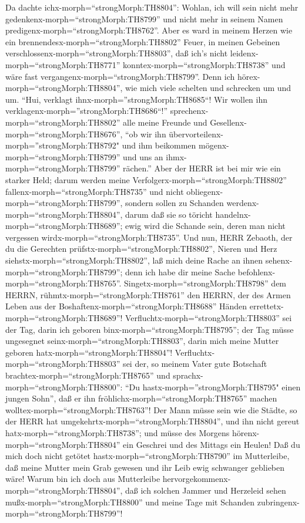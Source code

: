  Da dachte ichx-morph=``strongMorph:TH8804'': Wohlan, ich
will sein nicht mehr gedenkenx-morph=``strongMorph:TH8799'' und nicht
mehr in seinem Namen predigenx-morph=``strongMorph:TH8762''. Aber es
ward in meinem Herzen wie ein brennendesx-morph=``strongMorph:TH8802''
Feuer, in meinen Gebeinen verschlossenx-morph=``strongMorph:TH8803'',
daß ich's nicht leidenx-morph=``strongMorph:TH8771''
konntex-morph=``strongMorph:TH8738'' und wäre fast
vergangenx-morph=``strongMorph:TH8799''.  Denn ich
hörex-morph=``strongMorph:TH8804'', wie mich viele schelten und
schrecken um und um. ``Hui, verklagt ihnx-morph=''strongMorph:TH8685``!
Wir wollen ihn verklagenx-morph=''strongMorph:TH8686``!''
sprechenx-morph=``strongMorph:TH8802'' alle meine Freunde und
Gesellenx-morph=``strongMorph:TH8676'', ``ob wir ihn
übervorteilenx-morph=''strongMorph:TH8792" und ihm beikommen
mögenx-morph=``strongMorph:TH8799'' und uns an
ihmx-morph=``strongMorph:TH8799'' rächen.''  Aber der HERR
ist bei mir wie ein starker Held; darum werden meine
Verfolgerx-morph=``strongMorph:TH8802''
fallenx-morph=``strongMorph:TH8735'' und nicht
obliegenx-morph=``strongMorph:TH8799'', sondern sollen zu Schanden
werdenx-morph=``strongMorph:TH8804'', darum daß sie so töricht
handelnx-morph=``strongMorph:TH8689''; ewig wird die Schande sein, deren
man nicht vergessen wirdx-morph=``strongMorph:TH8735''. 
Und nun, HERR Zebaoth, der du die Gerechten
prüfstx-morph=``strongMorph:TH8802'', Nieren und Herz
siehstx-morph=``strongMorph:TH8802'', laß mich deine Rache an ihnen
sehenx-morph=``strongMorph:TH8799''; denn ich habe dir meine Sache
befohlenx-morph=``strongMorph:TH8765''. 
Singetx-morph=``strongMorph:TH8798'' dem HERRN,
rühmtx-morph=``strongMorph:TH8761'' den HERRN, der des Armen Leben aus
der Boshaftenx-morph=``strongMorph:TH8688'' Händen
errettetx-morph=``strongMorph:TH8689''! 
Verfluchtx-morph=``strongMorph:TH8803'' sei der Tag, darin ich geboren
binx-morph=``strongMorph:TH8795''; der Tag müsse ungesegnet
seinx-morph=``strongMorph:TH8803'', darin mich meine Mutter geboren
hatx-morph=``strongMorph:TH8804''! 
Verfluchtx-morph=``strongMorph:TH8803'' sei der, so meinem Vater gute
Botschaft brachtex-morph=``strongMorph:TH8765'' und
sprachx-morph=``strongMorph:TH8800'': ``Du
hastx-morph=''strongMorph:TH8795" einen jungen Sohn'', daß er ihn
fröhlichx-morph=``strongMorph:TH8765'' machen
wolltex-morph=``strongMorph:TH8763''!  Der Mann müsse sein
wie die Städte, so der HERR hat umgekehrtx-morph=``strongMorph:TH8804'',
und ihn nicht gereut hatx-morph=``strongMorph:TH8738''; und müsse des
Morgens hörenx-morph=``strongMorph:TH8804'' ein Geschrei und des Mittags
ein Heulen!  Daß du mich doch nicht getötet
hastx-morph=``strongMorph:TH8790'' im Mutterleibe, daß meine Mutter mein
Grab gewesen und ihr Leib ewig schwanger geblieben wäre! 
Warum bin ich doch aus Mutterleibe
hervorgekommenx-morph=``strongMorph:TH8804'', daß ich solchen Jammer und
Herzeleid sehen mußx-morph=``strongMorph:TH8800'' und meine Tage mit
Schanden zubringenx-morph=``strongMorph:TH8799''!

